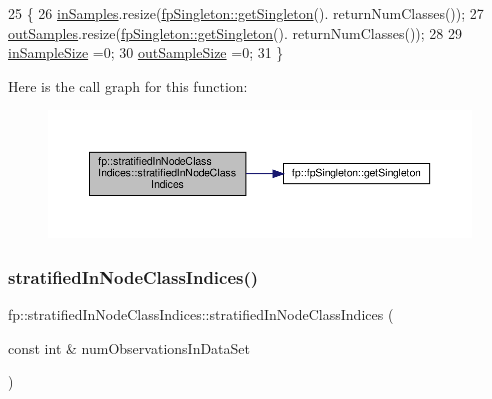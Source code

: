 \begin{DoxyCode}
25                                           \{
26                 \hyperlink{classfp_1_1stratifiedInNodeClassIndices_a6bfa636c77b48163f5d245959ea753d0}{inSamples}.resize(\hyperlink{classfp_1_1fpSingleton_a8bdae77b68521003e3fc630edec2e240}{fpSingleton::getSingleton}().
      returnNumClasses());
27                 \hyperlink{classfp_1_1stratifiedInNodeClassIndices_aa569f727e65e0b4b0815e71c1ee819e8}{outSamples}.resize(\hyperlink{classfp_1_1fpSingleton_a8bdae77b68521003e3fc630edec2e240}{fpSingleton::getSingleton}().
      returnNumClasses());
28 
29                 \hyperlink{classfp_1_1stratifiedInNodeClassIndices_a2acb617e3212806ae7f994d925bd1468}{inSampleSize} =0;
30                 \hyperlink{classfp_1_1stratifiedInNodeClassIndices_aa947b545e6751902344e832fcc1c9641}{outSampleSize} =0;
31             \}
\end{DoxyCode}
Here is the call graph for this function\+:\nopagebreak
\begin{figure}[H]
\begin{center}
\leavevmode
\includegraphics[width=350pt]{classfp_1_1stratifiedInNodeClassIndices_a41dd9148191e93d4cae66ddac33a4248_cgraph}
\end{center}
\end{figure}
\mbox{\label{classfp_1_1stratifiedInNodeClassIndices_acceb2fa1061c82ec37da7674784bc8b8}} 
\subsubsection{\texorpdfstring{stratified\+In\+Node\+Class\+Indices()}{stratifiedInNodeClassIndices()}\hspace{0.1cm}{\footnotesize\ttfamily [2/2]}}
{\footnotesize\ttfamily fp\+::stratified\+In\+Node\+Class\+Indices\+::stratified\+In\+Node\+Class\+Indices (\begin{DoxyParamCaption}\item[{const int \&}]{num\+Observations\+In\+Data\+Set }\end{DoxyParamCaption})\hspace{0.3cm}{\ttfamily [inline]}}



